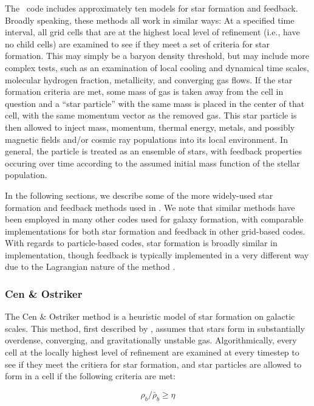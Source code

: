 The \enzo\ code includes approximately ten models for star formation
and feedback.  Broadly speaking, these methods all work in similar
ways: At a specified time interval, all grid cells that are at the
highest local level of refinement (i.e., have no child cells) are
examined to see if they meet a set of criteria for star formation.
This may simply be a baryon density threshold, but may include more
complex tests, such as an examination of local cooling and dynamical
time scales, molecular hydrogen fraction, metallicity, and converging
gas flows.  If the star formation criteria are met, some mass of gas
is taken away from the cell in question and a ``star particle'' with
the same mass is placed in the center of that cell, with the same
momentum vector as the removed gas.  This star particle is then
allowed to inject mass, momentum, thermal energy, metals, and possibly
magnetic fields and/or cosmic ray populations into its local
environment.  In general, the particle is treated as an ensemble of
stars, with feedback properties occuring over time according to the
assumed initial mass function of the stellar population.

In the following sections, we describe some of the more widely-used
star formation and feedback methods used in \enzo.  We note that
similar methods have been employed in many other codes used for galaxy
formation, with comparable implementations for both star formation and
feedback in other grid-based codes.  With regards to particle-based
codes, star formation is broadly similar in implementation, though
feedback is typically implemented in a very different way due to the
Lagrangian nature of the method \citep[see,
e.g.,][]{sh03a,sh03b,hs03}.

\subsubsection{Cen \& Ostriker}
\label{sec:starform_cen}

The Cen \& Ostriker method is a heuristic model of star formation on
galactic scales.  This method, first described by \citet{CO1992},
assumes that stars form in substantially overdense, converging, and
gravitationally unstable gas.  Algorithmically, every cell at the
locally highest level of refinement are examined at every timestep to
see if they meet the critiera for star formation, and star particles
are allowed to form in a cell if the following criteria are met:

\begin{equation}
\rho_b/\bar{\rho}_b \geq \eta
\label{cendens}
\end{equation} 

